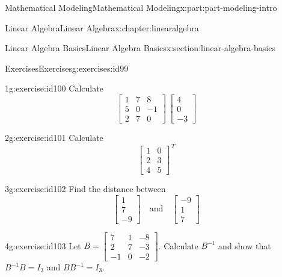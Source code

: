 \documentclass[oneside,10pt,]{book}
\numberwithin{equation}{section}
\begin{document}
\begin{partptx}{Mathematical Modeling}{}{Mathematical Modeling}{}{}{x:part:part-modeling-intro}
\begin{chapterptx}{Linear Algebra}{}{Linear Algebra}{}{}{x:chapter:linearalgebra}
\begin{sectionptx}{Linear Algebra Basics}{}{Linear Algebra Basics}{}{}{x:section:linear-algebra-basics}
%
%
\typeout{************************************************}
\typeout{************************************************}
%
\begin{exercises-subsection-numberless}{Exercises}{}{Exercises}{}{}{g:exercises:id99}
\begin{divisionexercise}{1}{}{}{g:exercise:id100}%
Calculate%
%
\begin{equation*}
\begin{bmatrix}
1 & 7 & 8 \\
5 & 0 & -1 \\
2 & 7 & 0 
\end{bmatrix}\,\begin{bmatrix}
4 \\
0 \\
-3
\end{bmatrix}
\end{equation*}
\end{divisionexercise}%
\begin{divisionexercise}{2}{}{}{g:exercise:id101}%
Calculate%
%
\begin{equation*}
\begin{bmatrix}
1 & 0 \\
2 & 3 \\
4 & 5
\end{bmatrix}^{\,T}
\end{equation*}
\end{divisionexercise}%
\begin{divisionexercise}{3}{}{}{g:exercise:id102}%
Find the distance between%
%
\begin{equation*}
\begin{bmatrix}
1 \\
7 \\
-9
\end{bmatrix} \quad\text{and} \quad \begin{bmatrix}
-9 \\
1\\
7
\end{bmatrix}
\end{equation*}
\end{divisionexercise}%
\begin{divisionexercise}{4}{}{}{g:exercise:id103}%
Let \(B = \begin{bmatrix} 7 & 1 & -8 \\
2 & 7 & -3 \\ -1 & 0 & -2 \end{bmatrix}\). Calculate \(B^{-1}\) and show that \(B^{-1}B= I_3\) and \(BB^{-1} = I_3\).%

\end{divisionexercise}
\end{exercises-subsection-numberless}
\end{sectionptx}
\end{chapterptx}
\end{partptx}
\end{document}
